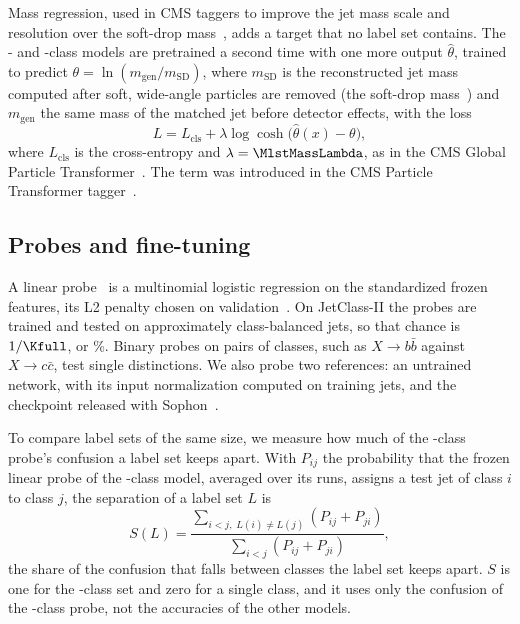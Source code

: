 Mass regression, used in CMS taggers to improve the jet mass scale and resolution over the soft-drop
mass~\cite{cmsmassreg,glopartdp}, adds a target that no label set contains.
The \Kres- and \Kcoarse-class models are pretrained a second time with one more output $\hat\theta$, trained to predict
$\theta = \ln(m_{\mathrm{gen}}/m_{\mathrm{SD}})$, where $m_{\mathrm{SD}}$ is the reconstructed jet mass computed after
soft, wide-angle particles are removed (the soft-drop mass~\cite{softdrop,mmdt}) and $m_{\mathrm{gen}}$ the same mass
of the matched jet before detector effects, with the loss
\begin{equation}
  L = L_{\mathrm{cls}} + \lambda \log\cosh\bigl(\hat\theta(x) - \theta\bigr) ,
  \label{eq:massloss}
\end{equation}
where $L_{\mathrm{cls}}$ is the cross-entropy and $\lambda = \MlstMassLambda$, as in the CMS Global Particle
Transformer~\cite{glopartdp}.
The term was introduced in the CMS Particle Transformer tagger~\cite{cmspart}.

\subsection{Probes and fine-tuning}
A linear probe~\cite{alain} is a multinomial logistic regression on the standardized frozen features, its L2 penalty
chosen on validation~\cite{kornblithtransfer,simclr}.
On JetClass-II the probes are trained and tested on approximately class-balanced jets, so that chance is
$1/\Kfull$, or \VChance\%.
Binary probes on pairs of classes, such as $X\to b\bar b$ against $X\to c\bar c$, test single distinctions.
We also probe two references: an untrained network, with its input normalization computed on training jets, and the
checkpoint released with Sophon~\cite{sophon}.

To compare label sets of the same size, we measure how much of the \Kfull-class probe's confusion a label set keeps
apart.
With $P_{ij}$ the probability that the frozen linear probe of the \Kfull-class model, averaged over its runs, assigns a
test jet of class $i$ to class $j$, the separation of a label set $L$ is
\begin{equation}
  S(L) = \frac{\sum_{i<j,\; L(i)\neq L(j)} \left(P_{ij}+P_{ji}\right)}{\sum_{i<j} \left(P_{ij}+P_{ji}\right)} ,
  \label{eq:separation}
\end{equation}
the share of the confusion that falls between classes the label set keeps apart.
$S$ is one for the \Kfull-class set and zero for a single class, and it uses only the confusion of the \Kfull-class
probe, not the accuracies of the other models.

